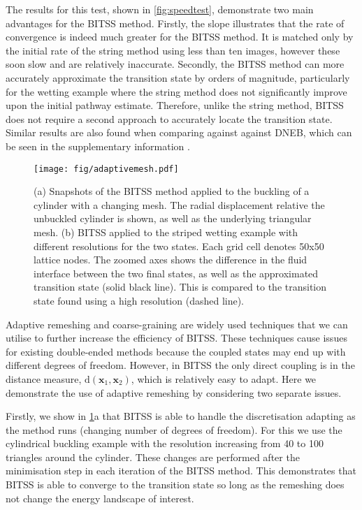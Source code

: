 \documentclass[aps,prl,twocolumn,10pt,groupedaddress]{revtex4-2}
\begin{document}
The results for this test, shown in \cref{fig:speedtest}, demonstrate two main advantages for the BITSS method.
Firstly, the slope illustrates that the rate of convergence is indeed much greater for the BITSS method.
It is matched only by the initial rate of the string method using less than ten images, however these soon slow and are relatively inaccurate.
Secondly, the BITSS method can more accurately approximate the transition state by orders of magnitude, particularly for the wetting example where the string method does not significantly improve upon the initial pathway estimate.
Therefore, unlike the string method, BITSS does not require a second approach to accurately locate the transition state.
Similar results are also found when comparing against against DNEB, which can be seen in the supplementary information \cite{Note1}.


\begin{figure}[tb]
  \texttt{[image: fig/adaptivemesh.pdf]}
  \caption{\label{fig:adaptivemesh}
    (a) Snapshots of the BITSS method applied to the buckling of a cylinder with a changing mesh.
        The radial displacement relative the unbuckled cylinder is shown, as well as the underlying triangular mesh.
    (b) BITSS applied to the striped wetting example with different resolutions for the two states.
        Each grid cell denotes 50x50 lattice nodes.
        The zoomed axes shows the difference in the fluid interface between the two final states, as well as the approximated transition state (solid black line).
        This is compared to the transition state found using a high resolution (dashed line).
  }
\end{figure}

Adaptive remeshing and coarse-graining are widely used techniques that we can utilise to further increase the efficiency of BITSS.
These techniques cause issues for existing double-ended methods because the coupled states may end up with different degrees of freedom.
However, in BITSS the only direct coupling is in the distance measure, $\mathrm{d}(\bm{x}_1,\bm{x}_2)$, which is relatively easy to adapt.
Here we demonstrate the use of adaptive remeshing by considering two separate issues.

Firstly, we show in \cref{fig:adaptivemesh}a that BITSS is able to handle the discretisation adapting as the method runs (changing number of degrees of freedom).
For this we use the cylindrical buckling example with the resolution increasing from 40 to 100 triangles around the cylinder.
These changes are performed after the minimisation step in each iteration of the BITSS method.
This demonstrates that BITSS is able to converge to the transition state so long as the remeshing does not change the energy landscape of interest.
\end{document}
